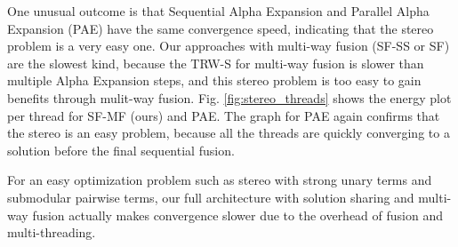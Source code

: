 One unusual outcome is that Sequential Alpha Expansion and Parallel
Alpha Expansion (PAE) have the same convergence speed, indicating that
the stereo problem is a very easy one.
Our approaches with multi-way fusion (SF-SS or SF) are the slowest kind,
because the TRW-S for multi-way fusion is slower than multiple Alpha
Expansion steps, and this stereo problem is too easy to gain benefits
through mulit-way fusion.
%
%
%
%
Fig. \ref{fig:stereo_threads} shows the energy plot per thread
for SF-MF (ours) and PAE. The graph for PAE again confirms that the
stereo is an easy problem, because all the threads are quickly
converging to a solution before the final sequential fusion.


For an easy optimization problem such as stereo with strong unary terms
and submodular pairwise terms, our full architecture with solution
sharing and multi-way fusion actually makes convergence slower due to the
overhead of fusion and multi-threading.









